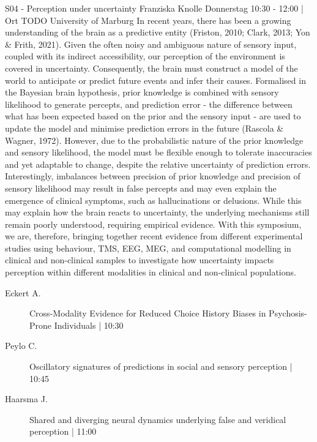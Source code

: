 
            \begin{symposium}
            {S04 - Perception under uncertainty}
            { Franziska Knolle}
            {Donnerstag 10:30 - 12:00 | Ort TODO}
            {University of Marburg }
            In recent years, there has been a growing understanding of the brain as a predictive entity (Friston, 2010; Clark, 2013; Yon \& Frith, 2021). Given the often noisy and ambiguous nature of sensory input, coupled with its indirect accessibility, our perception of the environment is covered in uncertainty. Consequently, the brain must construct a model of the world to anticipate or predict future events and infer their causes. Formalised in the Bayesian brain hypothesis, prior knowledge is combined with sensory likelihood to generate percepts, and prediction error - the difference between what has been expected based on the prior and the sensory input - are used to update the model and minimise prediction errors in the future (Rascola \& Wagner, 1972). However, due to the probabilistic nature of the prior knowledge and sensory likelihood, the model must be flexible enough to tolerate inaccuracies and yet adaptable to change, despite the relative uncertainty of prediction errors. Interestingly, imbalances between precision of prior knowledge and precision of sensory likelihood may result in false percepts and may even explain the emergence of clinical symptoms, such as hallucinations or delusions. While this may explain how the brain reacts to uncertainty, the underlying mechanisms still remain poorly understood, requiring empirical evidence.
With this symposium, we are, therefore, bringing together recent evidence from different experimental studies using behaviour, TMS, EEG, MEG, and computational modelling in clinical and non-clinical samples to investigate how uncertainty impacts perception within different modalities in clinical and non-clinical populations.
            \begin{description}    
            
                \item [ Eckert A.] Cross-Modality Evidence for Reduced Choice History Biases in Psychosis-Prone Individuals  \textcolor{mygray}{ | 10:30}    
                
                \item [ Peylo C.] Oscillatory signatures of predictions in social and sensory perception  \textcolor{mygray}{ | 10:45}    
                
                \item [ Haarsma J.] Shared and diverging neural dynamics underlying false and veridical perception  \textcolor{mygray}{ | 11:00}    
                

\end{description}
\end{symposium}
